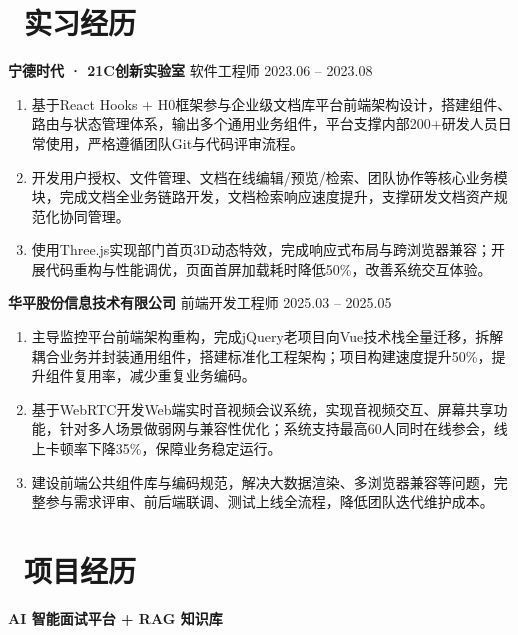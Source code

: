 ﻿\documentclass[10pt,a4paper]{ctexart}
\newcommand{\sect}[2]{%
  \section{\texorpdfstring{\makebox[\widthof{\faGraduationCap}][c]{{\mdseries\color{themecolor}#1}}\ #2}{#2}}
}
\begin{document}
\sect{\faUniversity}{实习经历}
\vspace{4pt}
\noindent\textbf{宁德时代 · 21C创新实验室} \hfill 软件工程师 \hfill 2023.06 -- 2023.08
\begin{enumerate}[topsep=0pt, partopsep=1pt, itemsep=2pt, parsep=0pt]
  \item 基于React Hooks + H0框架参与企业级文档库平台前端架构设计，搭建组件、路由与状态管理体系，输出\textcolor{themecolor}{多个通用业务组件}，平台支撑内部\textcolor{themecolor}{200+研发人员}日常使用，严格遵循团队Git与代码评审流程。
  \item 开发用户授权、文件管理、文档在线编辑/预览/检索、团队协作等核心业务模块，完成文档全业务链路开发，文档检索响应速度提升，支撑研发文档资产规范化协同管理。
  \item 使用Three.js实现部门首页3D动态特效，完成响应式布局与跨浏览器兼容；开展代码重构与性能调优，页面首屏加载耗时\textcolor{themecolor}{降低50\%}，改善系统交互体验。
\end{enumerate}
\vspace{4pt}

\noindent\textbf{华平股份信息技术有限公司} \hfill 前端开发工程师 \hfill 2025.03 -- 2025.05
\begin{enumerate}[topsep=0pt, partopsep=1pt, itemsep=2pt, parsep=0pt]
  \item 主导监控平台前端架构重构，完成jQuery老项目向Vue技术栈全量迁移，拆解耦合业务并封装通用组件，搭建标准化工程架构；项目构建速度\textcolor{themecolor}{提升50\%}，提升组件复用率，减少重复业务编码。
  \item 基于WebRTC开发Web端实时音视频会议系统，实现音视频交互、屏幕共享功能，针对多人场景做弱网与兼容性优化；系统支持最高\textcolor{themecolor}{60人同时在线参会}，线上卡顿率\textcolor{themecolor}{下降35\%}，保障业务稳定运行。
  \item 建设前端公共组件库与编码规范，解决大数据渲染、多浏览器兼容等问题，完整参与需求评审、前后端联调、测试上线全流程，降低团队迭代维护成本。
\end{enumerate}



\sect{\faFileText}{项目经历}
\textbf{AI 智能面试平台 + RAG 知识库}
\end{document}
